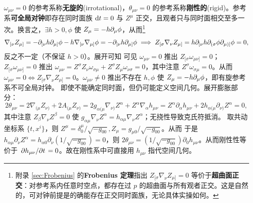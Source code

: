 $\omega_{\mu\nu} = 0$ 的参考系称\textbf{无旋的}(irrotational)，$\theta_{\mu\nu} = 0$ 的参考系称\textbf{刚性的}(rigid)。参考系\textbf{可全局对钟}即存在同时面族 $\dd t = 0$ 与 $Z^\mu$ 正交，且观者只与同时面相交至多一次。换言之，$\exists h> 0, \phi$ 使 $Z_\mu = -h\partial_\mu \phi$，从而\footnote{附录 \ref{sec:Frobenius} 的\textbf{Frobenius 定理}指出 $Z_{[\sigma}\nabla_{\nu} Z_{\mu]} = 0$ 等价于\textbf{超曲面正交}：对参考系内任意时空点，都存在过 $p$ 的超曲面与所有观者正交。这是自然的，可对钟前提是的确能存在正交同时面族，无论具体实操如何。}
\[\nabla_{[\nu} Z_{\mu]} = -\partial_{[\nu} h \partial_{\mu]}\phi -h \nabla_{[\nu} \nabla_{\mu]}\phi = -\partial_{[\nu} h \partial_{\mu]}\phi\implies Z_{[\sigma}\nabla_{\nu} Z_{\mu]} = h\partial_{[\nu} h \partial_{(\sigma}\phi \partial_{\mu)]}\phi = 0,\]
反之不一定（不保证 $h>0$）。展开可知
可见 $\omega_{\mu\nu} = 0$ 推出 $ Z_{[\sigma} \omega_{\mu\nu]} = 0$；$Z_{[\sigma} \omega_{\mu\nu]} = 0$ 推出 $\omega_{\mu\nu} = Z^\sigma Z_{\nu} \omega_{\sigma\mu} + Z^\sigma Z_{\mu} \omega_{\nu\sigma} = 0$，其中注意 $Z^\sigma \omega_{\sigma\mu} = 0$。从而 $\omega_{\mu\nu} = 0\iff Z_{[\sigma}\nabla_{\nu} Z_{\mu]} = 0$。$\omega_{\mu\nu} \ne 0$ 推出不存在 $h,\phi$ 使 $Z_\mu = -h\partial_\mu \phi$，即有旋参考系不可全局对钟。
即使不能确定同时面，但仍可能定义空间几何。展开膨胀部分：
\[2\theta_{\mu\nu} =2\nabla_{(\mu}Z_{\nu)}+2 A_{(\mu}Z_{\nu)}
=2g_{\alpha(\mu}\nabla_{\nu)} Z^\alpha
+Z^\alpha\nabla_\alpha h_{\mu\nu}=Z^\alpha\partial_\alpha h_{\mu\nu}
  +2h_{\alpha(\mu}\partial_{\nu)} Z^\alpha = 0,\]
其中注意 $Z_{\beta}\nabla_\nu Z^\beta = 0$ 使 $g_{\alpha\mu}\nabla_{\nu} Z^\alpha=h_{\alpha\mu}\nabla_{\nu} Z^\alpha$；无挠性导致克氏符抵消。
取共动坐标系 $\{t,x^i\}$，则 $Z^\mu = \delta^\mu_0/\sqrt{-g_{00}},Z_\mu = g_{\mu 0}/\sqrt{-g_{00}}$。从而
于是 $h_{\alpha\mu}\partial_{\nu} Z^\alpha = h_{\alpha 0}\partial_{\nu}(1/\sqrt{-g_{00}})=0$，则 $2\theta_{\mu\nu} = (1/\sqrt{-g_{00}})\partial_0 h_{\mu\nu}$。从而刚性性等价于 $\pdv*{h_{\mu\nu}}{t}=0$。故在刚性系中可直接用 $h_{\mu\nu}$ 指代空间几何。

